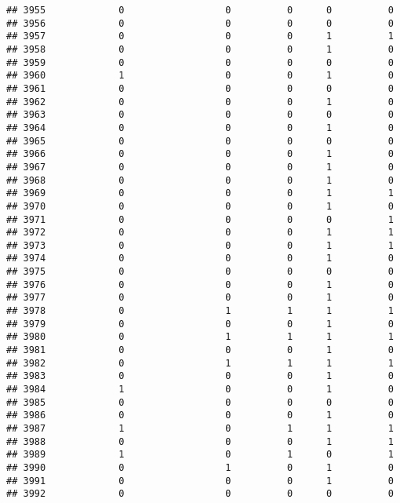 \documentclass[
]{article}
\begin{document}
\begin{verbatim}
## 3955             0                  0          0      0          0
## 3956             0                  0          0      0          0
## 3957             0                  0          0      1          1
## 3958             0                  0          0      1          0
## 3959             0                  0          0      0          0
## 3960             1                  0          0      1          0
## 3961             0                  0          0      0          0
## 3962             0                  0          0      1          0
## 3963             0                  0          0      0          0
## 3964             0                  0          0      1          0
## 3965             0                  0          0      0          0
## 3966             0                  0          0      1          0
## 3967             0                  0          0      1          0
## 3968             0                  0          0      1          0
## 3969             0                  0          0      1          1
## 3970             0                  0          0      1          0
## 3971             0                  0          0      0          1
## 3972             0                  0          0      1          1
## 3973             0                  0          0      1          1
## 3974             0                  0          0      1          0
## 3975             0                  0          0      0          0
## 3976             0                  0          0      1          0
## 3977             0                  0          0      1          0
## 3978             0                  1          1      1          1
## 3979             0                  0          0      1          0
## 3980             0                  1          1      1          1
## 3981             0                  0          0      1          0
## 3982             0                  1          1      1          1
## 3983             0                  0          0      1          0
## 3984             1                  0          0      1          0
## 3985             0                  0          0      0          0
## 3986             0                  0          0      1          0
## 3987             1                  0          1      1          1
## 3988             0                  0          0      1          1
## 3989             1                  0          1      0          1
## 3990             0                  1          0      1          0
## 3991             0                  0          0      1          0
## 3992             0                  0          0      0          0

\end{verbatim}
\end{document}
